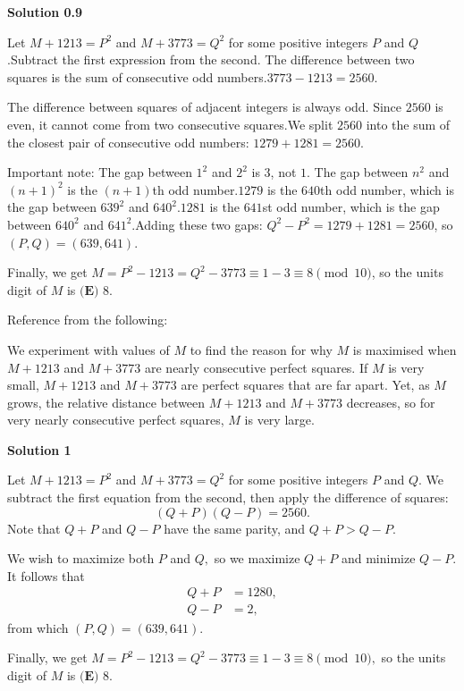 \begin{enumerate}
\textbf{Solution 0.9}

Let $M+1213=P^2$ and $M+3773=Q^2$ for some positive integers $P$ and $Q$.Subtract the first expression from the second. The difference between two squares is the sum of consecutive odd numbers.$3773 - 1213 = 2560$.

 The difference between squares of adjacent integers is always odd. Since $2560$ is even, it cannot come from two consecutive squares.We split $2560$ into the sum of the closest pair of consecutive odd numbers: $1279 + 1281 = 2560$.

 Important note: The gap between $1^2$ and $2^2$ is $3$, not $1$. The gap between $n^2$ and $(n+1)^2$ is the $(n+1)$th odd number.$1279$ is the $640$th odd number, which is the gap between $639^2$ and $640^2$.$1281$ is the $641$st odd number, which is the gap between $640^2$ and $641^2$.Adding these two gaps: $Q^2-P^2 = 1279+1281=2560$, so $(P,Q)=(639,641)$.

 Finally, we get $M=P^2-1213=Q^2-3773\equiv 1-3\equiv 8\pmod{10}$, so the units digit of $M$ is $\boxed{\textbf{(E) }8}$.

 Reference from the following:

 We experiment with values of $M$ to find the reason for why $M$ is maximised when $M + 1213$ and $M + 3773$ are nearly consecutive perfect squares. If $M$ is very small, $M + 1213$ and $M + 3773$ are perfect squares that are far apart. Yet, as $M$ grows, the relative distance between $M + 1213$ and $M + 3773$ decreases, so for very nearly consecutive perfect squares, $M$ is very large.

 



\textbf{Solution 1}

Let $M+1213=P^2$ and $M+3773=Q^2$ for some positive integers $P$ and $Q.$ We subtract the first equation from the second, then apply the difference of squares: 
 \[(Q+P)(Q-P)=2560.\] Note that $Q+P$ and $Q-P$ have the same parity, and $Q+P>Q-P.$ 

 We wish to maximize both $P$ and $Q,$ so we maximize $Q+P$ and minimize $Q-P.$ It follows that
 \begin{align*} Q+P&=1280, \\ Q-P&=2, \end{align*}
from which $(P,Q)=(639,641).$

 Finally, we get $M=P^2-1213=Q^2-3773\equiv1-3\equiv8\pmod{10},$ so the units digit of $M$ is $\boxed{\textbf{(E) }8}.$





\end{enumerate}
